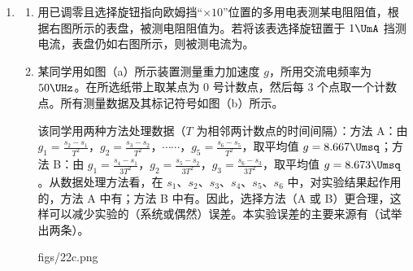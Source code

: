 \documentclass[\gkver]{gaokaozhenti}
\begin{document}
\begin{enumerate}

\item
\begin{enumerate}
	\item
	用已调零且选择旋钮指向欧姆挡“$\times 10$”位置的多用电表测某电阻阻值，根据右图所示的表盘，被测电阻阻值为\tkanswer[2.0cm]{$220\UO$}。若将该表选择旋钮置于 $1\UmA$ 挡测电流，表盘仍如右图所示，则被测电流为\tkanswer[1.5cm]{$0.40\UmA$}。


	\item
	某同学用如图（a）所示装置测量重力加速度 $g$，所用交流电频率为 $50\UHz$。在所选纸带上取某点为 0 号计数点，然后每 3 个点取一个计数点。所有测量数据及其标记符号如图（b）所示。

	该同学用两种方法处理数据（$T$ 为相邻两计数点的时间间隔）：方法 A：由 $g_{1}=\frac{s_{2}-s_{1}}{T^{2}}$，$g_{2}=\frac{s_{3}-s_{2}}{T^{2}}$，$\cdots\cdots$，$g_{5}=\frac{s_{6}-s_{5}}{T^{2}}$，取平均值 $g=8.667\Umsq$；方法 B：由 $g_{1}=\frac{s_{4}-s_{1}}{3T^{2}}$，$g_{2}=\frac{s_{5}-s_{2}}{3T^{2}}$，$g_{3}=\frac{s_{6}-s_{3}}{3T^{2}}$，取平均值 $g=8.673\Umsq$。从数据处理方法看，在 $s_{1}$、$s_{2}$、$s_{3}$、$s_{4}$、$s_{5}$、$s_{6}$ 中，对实验结果起作用的，方法 A 中有；方法 B 中有。因此，选择方法（A 或 B）更合理，这样可以减少实验的（系统或偶然）误差。本实验误差的主要来源有（试举出两条）。

	{figs/22c.png}
\end{enumerate}

\end{enumerate}
\end{document}
